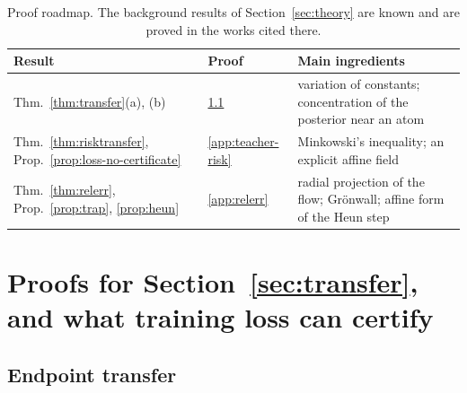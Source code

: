 \documentclass{article} %
\theoremstyle{plain}
\theoremstyle{definition}
\theoremstyle{remark}
\begin{document}
\begin{table}[h]
\centering\small
\begin{tabular}{@{}p{}p{}p{}@{}}
\toprule
Result & Proof & Main ingredients\\
\midrule
Thm.~\ref{thm:transfer}(a), (b) & \ref{apx:pf-transfer-all} & variation of constants; concentration of the posterior near an atom\\
Thm.~\ref{thm:risktransfer}, Prop.~\ref{prop:loss-no-certificate} & \ref{app:teacher-risk} & Minkowski's inequality; an explicit affine field\\
Thm.~\ref{thm:relerr}, Prop.~\ref{prop:trap}, \ref{prop:heun} & \ref{app:relerr} & radial projection of the flow; Gr\"onwall; affine form of the Heun step\\
\bottomrule
\end{tabular}
\caption{Proof roadmap. The background results of Section~\ref{sec:theory} are known and are
proved in the works cited there.}
\label{tab:roadmap}
\end{table}

\section{Proofs for Section~\ref{sec:transfer}, and what training loss can certify}
\label{app:transfer}

\subsection{Endpoint transfer}
\label{apx:pf-transfer-all}

\label{apx:pf-transfer}
\thmtransfer*
\end{document}
